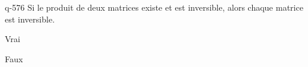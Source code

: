 \begin{truefalse}{q-576}
Si le produit de deux matrices existe et est inversible, alors chaque matrice est inversible.
\item Vrai
\item* Faux
\end{truefalse}

